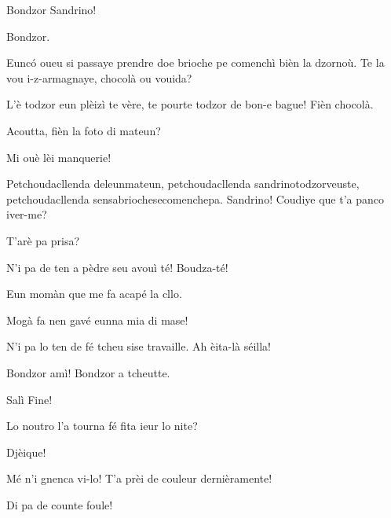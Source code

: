 \begin{drama}
\Saventaspeaks Bondzor Sandrino!

\Sandrinospeaks Bondzor.

\Saventaspeaks Eunc\'o oueu si passaye prendre doe brioche pe comenchì bièn la dzornoù. Te la vou i-z-armagnaye, chocolà ou vouida?

\Sandrinospeaks L'è todzor eun plèizì te vère, te pourte todzor de bon-e bague! Fièn chocolà.


\Saventaspeaks Acoutta, fièn la foto di mateun?

\Sandrinospeaks Mi ouè lèi manquerie!



\Saventaspeaks{} Petchoudacllenda deleunmateun, petchoudacllenda sandrinotodzorveuste, petchoudacllenda sensabriochesecomenchepa.  Sandrino! Coudiye que t'a panco iver-me?

\Sandrinospeaks{} T'arè pa prisa?

\Saventaspeaks N'i pa de ten a pèdre seu avouì té! Boudza-té!

\Sandrinospeaks Eun momàn que me fa acapé la cllo.


\Saventaspeaks{} Mogà fa nen gavé eunna mia di mase!

\Sandrinospeaks N'i pa lo ten de fé tcheu sise travaille. Ah èita-là séilla!


\Saventaspeaks Bondzor amì! Bondzor a tcheutte.

\Tcheuttespeaks Salì Fine!

\Saventaspeaks{} Lo noutro l'a tourna fé fita ieur lo nite?

\Tuenospeaks Djèique!

\Richardspeaks Mé n'i gnenca vi-lo!  T'a prèi de couleur dernièramente!

\Spritzspeaks{} Di pa de counte foule!


\end{drama}
